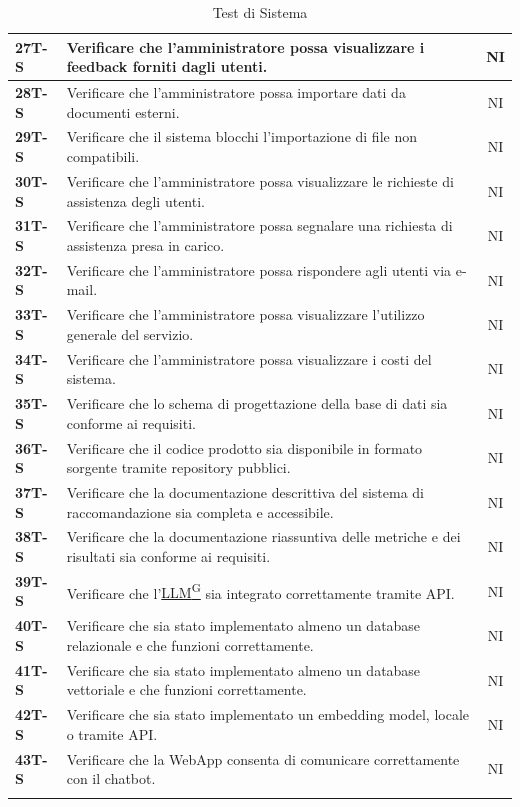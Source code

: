 \documentclass{article}
\begin{document}
\begin{longtable}{|>{\centering\arraybackslash}m{}|>{\raggedright\arraybackslash}m{}|c|}
    \hline
    \textbf{27T-S} & Verificare che l’amministratore possa visualizzare i feedback forniti dagli utenti. & NI \\
    \hline
    \textbf{28T-S} & Verificare che l’amministratore possa importare dati da documenti esterni. & NI \\
    \hline
    \textbf{29T-S} & Verificare che il sistema blocchi l’importazione di file non compatibili. & NI \\
    \hline
    \textbf{30T-S} & Verificare che l’amministratore possa visualizzare le richieste di assistenza degli utenti. & NI \\
    \hline
    \textbf{31T-S} & Verificare che l’amministratore possa segnalare una richiesta di assistenza presa in carico. & NI \\
    \hline
    \textbf{32T-S} & Verificare che l’amministratore possa rispondere agli utenti via e-mail. & NI \\
    \hline
    \textbf{33T-S} & Verificare che l’amministratore possa visualizzare l’utilizzo generale del servizio. & NI \\
    \hline
    \textbf{34T-S} & Verificare che l’amministratore possa visualizzare i costi del sistema. & NI \\
    \hline
    \textbf{35T-S} & Verificare che lo schema di progettazione della base di dati sia conforme ai requisiti. & NI \\
    \hline
    \textbf{36T-S} & Verificare che il codice prodotto sia disponibile in formato sorgente tramite repository pubblici. & NI \\
    \hline
    \textbf{37T-S} & Verificare che la documentazione descrittiva del sistema di raccomandazione sia completa e accessibile. & NI \\
    \hline
    \textbf{38T-S} & Verificare che la documentazione riassuntiva delle metriche e dei risultati sia conforme ai requisiti. & NI \\
    \hline
    \textbf{39T-S} & Verificare che l’\href{https://code7crusaders.github.io/docs/RTB/documentazione_interna/glossario.html#llm-large-language-model}{LLM\textsuperscript{G}} sia integrato correttamente tramite API. & NI \\
    \hline
    \textbf{40T-S} & Verificare che sia stato implementato almeno un database relazionale e che funzioni correttamente. & NI \\
    \hline
    \textbf{41T-S} & Verificare che sia stato implementato almeno un database vettoriale e che funzioni correttamente. & NI \\
    \hline
    \textbf{42T-S} & Verificare che sia stato implementato un embedding model, locale o tramite API. & NI \\
    \hline
    \textbf{43T-S} & Verificare che la WebApp consenta di comunicare correttamente con il chatbot. & NI \\
    \hline
\caption{Test di Sistema}
\end{longtable}
\end{document}
